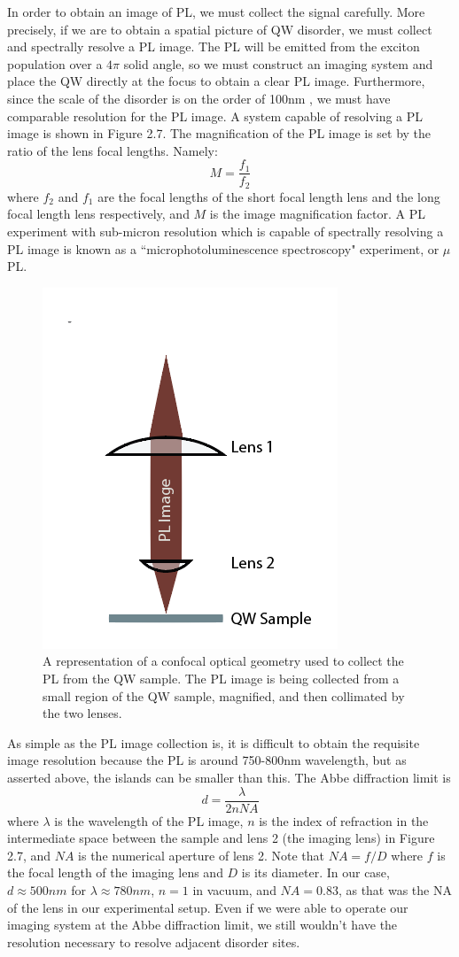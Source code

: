 \indent In order to obtain an image of PL, we must collect the signal carefully. More precisely, if we are to obtain a spatial picture of QW disorder, we must collect and spectrally resolve a PL image. The PL will be emitted from the exciton population over a $4 \pi$ solid angle, so we must construct an imaging system and place the QW directly at the focus to obtain a clear PL image. Furthermore, since the scale of the disorder is on the order of 100nm \cite{yoshitaterrace}, we must have comparable resolution for the PL image. A system capable of resolving a PL image is shown in Figure 2.7. The magnification of the PL image is set by the ratio of the lens focal lengths. Namely:
\begin{equation}
M = \frac{f_1}{f_2}
\end{equation}
where $f_2$ and $f_1$ are the focal lengths of the short focal length lens and the long focal length lens respectively, and $M$ is the image magnification factor. A PL experiment with sub-micron resolution which is capable of spectrally resolving a PL image is known as a ``microphotoluminescence spectroscopy" experiment, or $\mu$PL.
\begin{figure}[h!]
\label{confocal}
\centering
\includegraphics[width = .3\textwidth]{confocal1.png}
\caption{\doublespacing A representation of a confocal optical geometry used to collect the PL from the QW sample. The PL image is being collected from a small region of the QW sample, magnified, and then collimated by the two lenses.}
\end{figure}

\indent As simple as the PL image collection is, it is difficult to obtain the requisite image resolution because the PL is around 750-800nm wavelength, but as asserted above, the islands can be smaller than this. The Abbe diffraction limit is
\begin{equation}
d = \frac{\lambda}{2nNA}
\end{equation}
where $\lambda$ is the wavelength of the PL image, $n$ is the index of refraction in the intermediate space between the sample and lens 2 (the imaging lens) in Figure 2.7, and $NA$ is the numerical aperture of lens 2. Note that $NA = f / D$ where $f$ is the focal length of the imaging lens and $D$ is its diameter. In our case, $d \approx 500 nm$ for $\lambda \approx 780 nm$, $n = 1$ in vacuum, and $NA = 0.83$, as that was the NA of the lens in our experimental setup. Even if we were able to operate our imaging system at the Abbe diffraction limit, we still wouldn't have the resolution necessary to resolve adjacent disorder sites.

